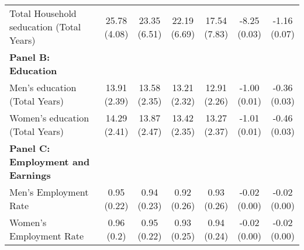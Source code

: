 \begin{table}[!h]
{\begin{threeparttable}
\begin{tabular}[t]{lcccccc}
\hspace{1em}Total Household seducation (Total Years) & \specialcell{25.78\\(4.08)} & \specialcell{23.35\\(6.51)} & \specialcell{22.19\\(6.69)} & \specialcell{17.54\\(7.83)} & \specialcell{-8.25\\(0.03)} & \specialcell{-1.16\\(0.07)}\\
\textbf{Panel B: Education} & \textbf{} & \textbf{} & \textbf{} & \textbf{} & \textbf{} & \textbf{}\\
\addlinespace
\hspace{1em}Men’s education (Total Years) & \specialcell{13.91\\(2.39)} & \specialcell{13.58\\(2.35)} & \specialcell{13.21\\(2.32)} & \specialcell{12.91\\(2.26)} & \specialcell{-1.00\\(0.01)} & \specialcell{-0.36\\(0.03)}\\
\hspace{1em}Women’s education (Total Years) & \specialcell{14.29\\(2.41)} & \specialcell{13.87\\(2.47)} & \specialcell{13.42\\(2.35)} & \specialcell{13.27\\(2.37)} & \specialcell{-1.01\\(0.01)} & \specialcell{-0.46\\(0.03)}\\
\textbf{Panel C: Employment and Earnings} & \textbf{} & \textbf{} & \textbf{} & \textbf{} & \textbf{} & \textbf{}\\
\hspace{1em}Men’s Employment Rate & \specialcell{0.95\\(0.22)} & \specialcell{0.94\\(0.23)} & \specialcell{0.92\\(0.26)} & \specialcell{0.93\\(0.26)} & \specialcell{-0.02\\(0.00)} & \specialcell{-0.02\\(0.00)}\\
\hspace{1em}Women’s Employment Rate & \specialcell{0.96\\(0.2)} & \specialcell{0.95\\(0.22)} & \specialcell{0.93\\(0.25)} & \specialcell{0.94\\(0.24)} & \specialcell{-0.02\\(0.00)} & \specialcell{-0.02\\(0.00)}\\

\end{tabular}
\end{threeparttable}}
\end{table}
